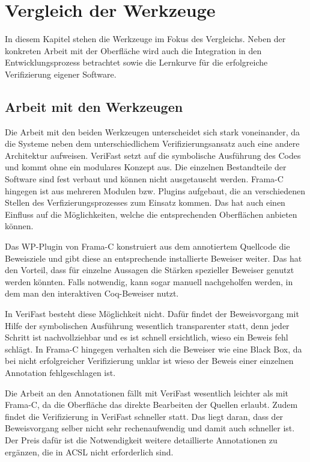 ﻿\chapter{Vergleich der Werkzeuge}

In diesem Kapitel stehen die Werkzeuge im Fokus des Vergleichs. Neben der konkreten Arbeit mit der
Oberfläche wird auch die Integration in den Entwicklungsprozess betrachtet sowie die Lernkurve für
die erfolgreiche Verifizierung eigener Software.

\section{Arbeit mit den Werkzeugen}

Die Arbeit mit den beiden Werkzeugen unterscheidet sich stark voneinander, da die Systeme
neben dem unterschiedlichem Verifizierungsansatz auch eine andere Architektur aufweisen.
VeriFast setzt auf die symbolische Ausführung des Codes und kommt ohne ein modulares Konzept aus.
Die einzelnen Bestandteile der Software sind fest verbaut und können nicht ausgetauscht werden.
Frama-C hingegen ist aus mehreren Modulen bzw. Plugins aufgebaut, die an verschiedenen Stellen des
Verfizierungsprozesses zum Einsatz kommen. Das hat auch einen Einfluss auf die Möglichkeiten, welche
die entsprechenden Oberflächen anbieten können.

Das WP-Plugin von Frama-C konstruiert aus dem annotiertem Quellcode die Beweisziele und gibt diese an 
entsprechende installierte Beweiser weiter. Das hat den Vorteil, dass für einzelne Aussagen die Stärken
spezieller Beweiser genutzt werden könnten. Falls notwendig, kann sogar manuell nachgeholfen werden, in
dem man den interaktiven Coq-Beweiser nutzt.

In VeriFast besteht diese Möglichkeit nicht. Dafür findet der Beweisvorgang mit Hilfe der symbolischen
Ausführung wesentlich transparenter statt, denn jeder Schritt ist nachvollziehbar und es ist schnell ersichtlich,
wieso ein Beweis fehl schlägt. In Frama-C hingegen verhalten sich die Beweiser wie eine Black Box, da
bei nicht erfolgreicher Verifizierung unklar ist wieso der Beweis einer einzelnen Annotation
fehlgeschlagen ist.

Die Arbeit an den Annotationen fällt mit VeriFast wesentlich leichter als mit Frama-C, da die
Oberfläche das direkte Bearbeiten der Quellen erlaubt. Zudem findet die Verifizierung in VeriFast
schneller statt. Das liegt daran, dass der Beweisvorgang selber nicht sehr rechenaufwendig und damit auch schneller\cite[Kap. 3]{jacobs-2010-1}
ist. Der Preis dafür ist die Notwendigkeit weitere detaillierte Annotationen zu ergänzen, die in ACSL nicht erforderlich
sind.


